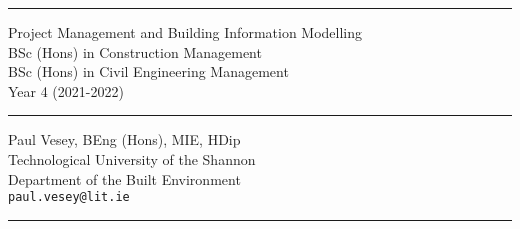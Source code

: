 
\thispagestyle{empty} %


\hrule

\vspace*{0.7cm} %


\begin{flushright}
\Huge Project Management and Building Information Modelling \\
\vspace*{0.7cm}
\Large BSc (Hons) in Construction Management\\
BSc (Hons) in Civil Engineering Management\\
Year 4 (2021-2022)
\end{flushright}

\vspace*{0.7cm} %
	
\normalsize

\hrule


\vfill %


{\centering \large 
\hfill Paul Vesey, \scriptsize BEng (Hons), MIE, HDip\normalsize \\
\hfill Technological University of the Shannon \\
\hfill Department of the Built Environment \\
\hfill \texttt{paul.vesey@lit.ie} \\
\vspace*{0.7cm} 
\hrule} %


\clearpage %

